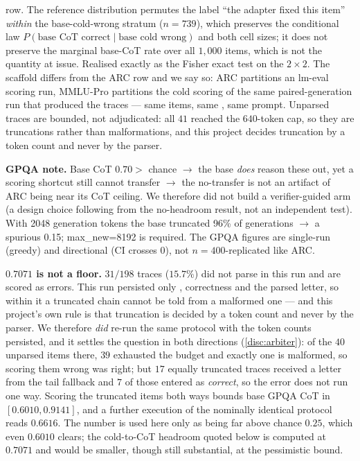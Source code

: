\begin{table}[tbp]
\begin{threeparttable}
\begin{tablenotes}[flushleft]
{row.} The reference distribution permutes the label ``the adapter fixed this item''
\emph{within} the base-cold-wrong stratum ($n{=}739$), which preserves the
conditional law $P(\text{base CoT correct} \mid \text{base cold wrong})$ and both
cell sizes; it does not preserve the marginal base-CoT rate over all $1{,}000$
items, which is not the quantity at issue. Realised exactly as the Fisher exact
test on the $2{\times}2$. The scaffold differs from the ARC row and we say so: ARC
partitions an lm-eval scoring run, MMLU-Pro partitions the cold scoring of the same
paired-generation run that produced the traces --- same items, same ,
same prompt. Unparsed traces are bounded, not adjudicated: all $41$ reached the
$640$-token cap, so they are truncations rather than malformations, and this project
decides truncation by a token count and never by the parser.
\item \textbf{GPQA note.} Base CoT $0.70 >$ chance $\rightarrow$ the base
\emph{does} reason these out, yet a scoring shortcut still cannot transfer
$\rightarrow$ the no-transfer is not an artifact of ARC being near its CoT ceiling.
We therefore did not build a verifier-guided arm (a design choice following from the
no-headroom result, not an independent test). With 2048 generation tokens the base
truncated 96\% of generations $\rightarrow$ a spurious 0.15; max\_new=8192 is
required. The GPQA figures are single-run (greedy) and directional (CI crosses 0),
not $n{=}400$-replicated like ARC.
\item \textbf{$0.7071$ is not a floor.} $31/198$ traces ($15.7\%$) did not parse in
this run and are scored as errors. This run persisted only ,
correctness and the parsed letter, so within it a truncated chain cannot be told
from a malformed one --- and this project's own rule is that truncation is decided
by a token count and never by the parser. We therefore \emph{did} re-run the same
protocol with the token counts persisted, and it settles the question in both
directions (\cref{disc:arbiter}): of the $40$ unparsed items there, $39$ exhausted
the budget and exactly one is malformed, so scoring them wrong was right; but $17$
equally truncated traces received a letter from the tail fallback and $7$ of those
entered as \emph{correct}, so the error does not run one way. Scoring the truncated
items both ways bounds base GPQA CoT in $[0.6010, 0.9141]$, and a further execution
of the nominally identical protocol reads $0.6616$. The number is used here only as
being far above chance $0.25$, which even $0.6010$ clears; the cold-to-CoT headroom
quoted below is computed at $0.7071$ and would be smaller, though still substantial,
at the pessimistic bound.
\end{tablenotes}
\end{threeparttable}
\end{table}


